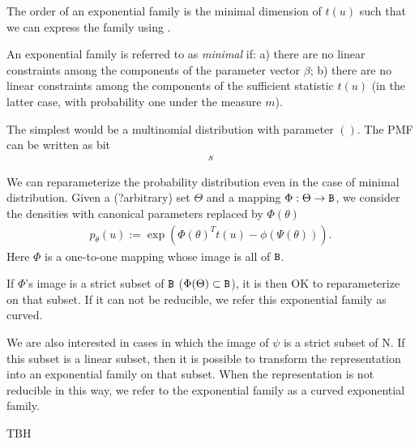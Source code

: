 \begin{define}[Order]
	The order of an exponential family is the minimal dimension of $t(u)$ such that we can express
	the family using .
\end{define}

\begin{define}
	An exponential family is referred to as \emph{minimal} if:
	a) there are no linear constraints among the components of the parameter vector $\beta$;
	b) there are no linear constraints among the components of the sufficient statistic $t(u)$
	(in the latter case, with probability one under the measure $m$).
\end{define}

\begin{example}
	The simplest would be a multinomial distribution with parameter $()$.
	The PMF can be written as bit
	\begin{align*}
		s
	\end{align*}
\end{example}

We can reparameterize the probability distribution even in the case of minimal distribution.
Given a (?arbitrary) set $\Theta$ and a mapping $\Phi: \Theta \to \mathtt{B}$,
we consider the densities with canonical parameters replaced by $\Phi(\theta)$
\begin{align*}
	p_\theta(u) := \exp(\Phi(\theta)^T t(u) - \phi(\Psi(\theta))).
\end{align*}
Here $\Phi$ is a one-to-one mapping whose image is all of $\mathtt{B}$.

If $\Phi$'s image is a strict subset of $\mathtt{B}$ ($\Phi(\Theta) \subset \mathtt{B}$),
it is then OK to reparameterize on that subset.
If it can not be reducible,
we refer this exponential family as curved.

We are also interested in cases in which the image of $\psi$ is a strict subset of N.
If this subset is a linear subset, then it is possible to transform the representation into an
exponential family on that subset. When the representation is not reducible in this way, we
refer to the exponential family as a curved exponential family.

\begin{define}
	TBH
\end{define}

